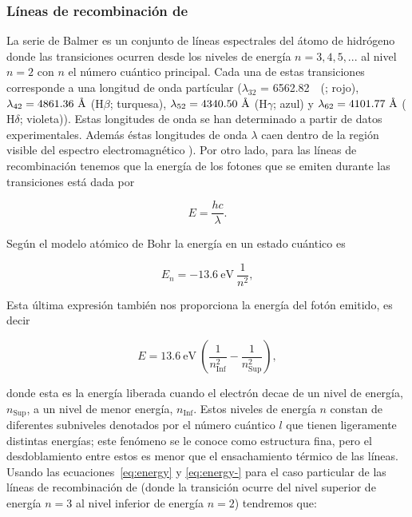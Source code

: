 \subsubsection{Líneas de recombinación de \ha{}}
\label{sec:lines-ha}

La serie de Balmer es un conjunto de líneas espectrales del átomo de hidrógeno donde las transiciones ocurren desde los niveles de energía \(n= 3,4,5,...\) al nivel \(n=2\) con \(n\) el número cuántico principal. Cada una de estas transiciones corresponde a una longitud de onda partícular (\(\lambda_{32}\) = 6562.82~\A~(\ha{}; rojo), \(\lambda_{42} = 4861.36~\text{\AA{}}{}\) (\(\mathrm{H}\beta\); turquesa), \(\lambda_{52} = 4340.50~\text{\AA{}}{}\) (\(\mathrm{H}\gamma\); azul) y \(\lambda_{62} = 4101.77~\text{\AA{}}{}\) (\(\mathrm{H}\delta\); violeta)). Estas longitudes de onda se han determinado a partir de datos experimentales. Además éstas longitudes de onda \(\lambda\) caen dentro de la región visible del espectro electromagnético \citep{Carroll:1996}). Por otro lado, para las líneas de recombinación tenemos que la energía de los fotones que se emiten durante las transiciones está dada por

\begin{equation}
  \label{eq:energy}
  E = \frac{hc}{\lambda}. 
\end{equation}
 
Según el modelo atómico de Bohr la energía en un estado cuántico es

\begin{equation}
  \label{eq:quantum}
  E_{n} = -13.6~\text{eV}~\frac{1}{n^{2}},
\end{equation}

Esta última expresión también nos proporciona la energía del fotón emitido, es decir

\begin{equation}
  \label{eq:energy-}
 E = 13.6~\text{eV}~\left(\frac{1}{n_{\text{Inf}}^{2}}-\frac{1}{n_{\text{Sup}}^{2}}\right),
\end{equation}

 donde esta es la energía liberada cuando el electrón decae de un nivel de energía, \(n_{\text{Sup}}\), a un nivel de menor energía, \(n_{\text{Inf}}\). Estos niveles de energía \(n\) constan de diferentes subniveles denotados por el número cuántico \(l\) que tienen ligeramente distintas energías; este fenómeno se le conoce como estructura fina, pero el desdoblamiento entre estos es menor que el ensachamiento térmico de las líneas. Usando las ecuaciones~\ref{eq:energy} y \ref{eq:energy-} para el caso particular de las líneas de recombinación de \ha{} (donde la transición ocurre del nivel superior de energía \(n=3\) al nivel inferior de energía \(n=2\)) tendremos que: 


